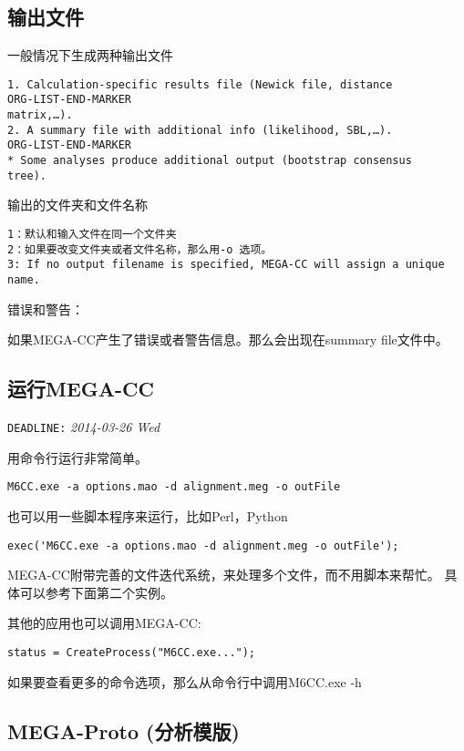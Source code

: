 \documentclass[11pt]{ctexart}
\begin{document}
\subsection{输出文件}
\label{sec-2-3}

一般情况下生成两种输出文件


\begin{verbatim}
1. Calculation-specific results file (Newick file, distance 
ORG-LIST-END-MARKER
matrix,…). 
2. A summary file with additional info (likelihood, SBL,…). 
ORG-LIST-END-MARKER
* Some analyses produce additional output (bootstrap consensus 
tree).
\end{verbatim}
输出的文件夹和文件名称


\begin{verbatim}
1：默认和输入文件在同一个文件夹
2：如果要改变文件夹或者文件名称，那么用-o 选项。
3: If no output filename is specified, MEGA-CC will assign a unique 
name.
\end{verbatim}
错误和警告：

如果MEGA-CC产生了错误或者警告信息。那么会出现在summary file文件中。
\subsection{运行MEGA-CC}
\label{sec-2-4}

   \texttt{DEADLINE:} \textit{2014-03-26 Wed}

用命令行运行非常简单。

\begin{verbatim}
M6CC.exe -a options.mao -d alignment.meg -o outFile
\end{verbatim}
也可以用一些脚本程序来运行，比如Perl，Python

\begin{verbatim}
exec('M6CC.exe -a options.mao -d alignment.meg -o outFile');
\end{verbatim}
MEGA-CC附带完善的文件迭代系统，来处理多个文件，而不用脚本来帮忙。
具体可以参考下面第二个实例。

其他的应用也可以调用MEGA-CC:

\begin{verbatim}
status = CreateProcess("M6CC.exe...");
\end{verbatim}
如果要查看更多的命令选项，那么从命令行中调用M6CC.exe -h
\subsection{MEGA-Proto (分析模版)}
\label{sec-2-5}
\end{document}
